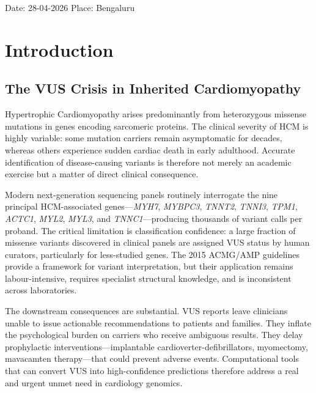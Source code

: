\documentclass[12pt,a4paper]{article}
\begin{document}
\vfill

Date: 28-04-2026 \hfill Place: Bengaluru

\newpage


\tableofcontents
\newpage


\newpage



\section{Introduction}
\label{sec:intro}

\subsection{The VUS Crisis in Inherited Cardiomyopathy}
\label{subsec:vus}

Hypertrophic Cardiomyopathy arises predominantly from heterozygous missense
mutations in genes encoding sarcomeric proteins. The clinical severity of
HCM is highly variable: some mutation carriers remain asymptomatic for
decades, whereas others experience sudden cardiac death in early adulthood.
Accurate identification of disease-causing variants is therefore not merely
an academic exercise but a matter of direct clinical consequence.

Modern next-generation sequencing panels routinely interrogate the nine
principal HCM-associated genes—\textit{MYH7}, \textit{MYBPC3},
\textit{TNNT2}, \textit{TNNI3}, \textit{TPM1}, \textit{ACTC1},
\textit{MYL2}, \textit{MYL3}, and \textit{TNNC1}—producing thousands of
variant calls per proband. The critical limitation is classification
confidence: a large fraction of missense variants discovered in clinical
panels are assigned VUS status by human curators, particularly for
less-studied genes. The 2015 ACMG/AMP guidelines provide a framework for
variant interpretation, but their application remains labour-intensive,
requires specialist structural knowledge, and is inconsistent across
laboratories.

The downstream consequences are substantial. VUS reports leave clinicians
unable to issue actionable recommendations to patients and families. They
inflate the psychological burden on carriers who receive ambiguous results.
They delay prophylactic interventions—implantable cardioverter-defibrillators,
myomectomy, mavacamten therapy—that could prevent adverse events.
Computational tools that can convert VUS into high-confidence predictions
therefore address a real and urgent unmet need in cardiology genomics.
\end{document}
